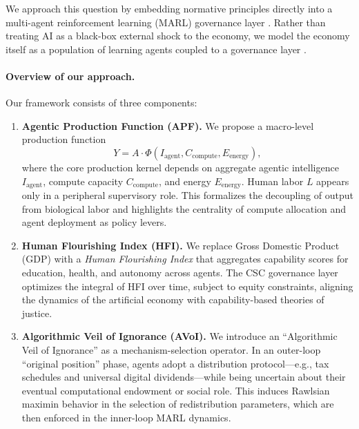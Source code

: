 \documentclass{article}
\begin{document}
We approach this question by embedding normative principles directly into a multi-agent reinforcement learning (MARL) governance layer \cite{leibo2017multi,dafoe2020open}. Rather than treating AI as a black-box external shock to the economy, we model the economy itself as a population of learning agents coupled to a governance layer \cite{zheng2020ai,wu2024learning}.

\paragraph{Overview of our approach.}
Our framework consists of three components:

\begin{enumerate}
  \item \textbf{Agentic Production Function (APF).} We propose a macro-level production function
  \begin{equation}
    Y = A \cdot \Phi(I_{\text{agent}}, C_{\text{compute}}, E_{\text{energy}}),
    \label{eq:apf}
  \end{equation}
  where the core production kernel depends on aggregate agentic intelligence $I_{\text{agent}}$, compute capacity $C_{\text{compute}}$, and energy $E_{\text{energy}}$. Human labor $L$ appears only in a peripheral supervisory role. This formalizes the decoupling of output from biological labor and highlights the centrality of compute allocation and agent deployment as policy levers.

  \item \textbf{Human Flourishing Index (HFI).} We replace Gross Domestic Product (GDP) with a \emph{Human Flourishing Index} that aggregates capability scores for education, health, and autonomy across agents. The CSC governance layer optimizes the integral of HFI over time, subject to equity constraints, aligning the dynamics of the artificial economy with capability-based theories of justice.

  \item \textbf{Algorithmic Veil of Ignorance (AVoI).} We introduce an ``Algorithmic Veil of Ignorance'' as a mechanism-selection operator. In an outer-loop ``original position'' phase, agents adopt a distribution protocol---e.g., tax schedules and universal digital dividends---while being uncertain about their eventual computational endowment or social role. This induces Rawlsian maximin behavior in the selection of redistribution parameters, which are then enforced in the inner-loop MARL dynamics.
\end{enumerate}
\end{document}

